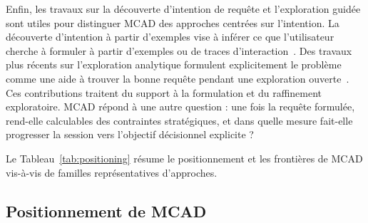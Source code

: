 \documentclass[journal]{IEEEtran}
\begin{document}
Enfin, les travaux sur la découverte d'intention de requête et l'exploration guidée sont utiles pour distinguer MCAD des approches centrées sur l'intention. La découverte d'intention à partir d'exemples vise à inférer ce que l'utilisateur cherche à formuler à partir d'exemples ou de traces d'interaction~\cite{FarihaMeliou2019}. Des travaux plus récents sur l'exploration analytique formulent explicitement le problème comme une aide à trouver la bonne requête pendant une exploration ouverte~\cite{ArenasExploratory2025}. Ces contributions traitent du support à la formulation et du raffinement exploratoire. MCAD répond à une autre question : une fois la requête formulée, rend-elle calculables des contraintes stratégiques, et dans quelle mesure fait-elle progresser la session vers l'objectif décisionnel explicite ?

Le Tableau~\ref{tab:positioning} résume le positionnement et les frontières de MCAD vis-à-vis de familles représentatives d'approches.

\subsection{Positionnement de MCAD}
\end{document}
